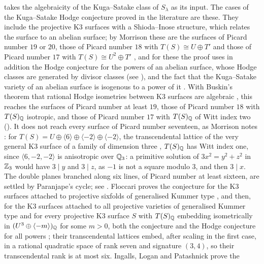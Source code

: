 \begin{remark}
\label{rem:mumfordks}
 takes the algebraicity of the Kuga--Satake class of
$S_{\lambda}$ as its input. The cases of the Kuga--Satake Hodge conjecture
proved in the literature are these. They include the projective K3 surfaces with
a Shioda--Inose structure, which relates the surface to an abelian surface;
by Morrison these are the surfaces of Picard number $19$ or $20$, those of
Picard number $18$ with $T(S)\cong U\oplus T'$ and those of Picard number
$17$ with $T(S)\cong U^{2}\oplus T'$
\cite[Theorem~6.3 and Corollary~6.4]{Mor84}, and for these the proof uses in
addition the Hodge conjecture for the powers of an abelian surface, whose
Hodge classes are generated by divisor classes (see \cite{MZ99}), and the
fact that the Kuga--Satake variety of an abelian surface is isogenous to a
power of it \cite{Mor85}. With Buskin's theorem that rational Hodge
isometries between K3 surfaces are algebraic \cite{Bus19}, this reaches the
surfaces of Picard number at least $19$, those of Picard number $18$ with
$T(S)_{\mathbb{Q}}$ isotropic, and those of Picard number $17$ with $T(S)_{\mathbb{Q}}$ of
Witt index two (). It does not reach every
surface of Picard number seventeen, as Morrison notes
\cite[Remark~7.2]{Mor84}: for
$T(S)=U\oplus\langle6\rangle\oplus\langle-2\rangle\oplus\langle-2\rangle$,
the transcendental lattice of the very general K3 surface of a family of
dimension three \cite[Corollary~2.10]{Mor84}, $T(S)_{\mathbb{Q}}$ has Witt index one,
since $\langle6,-2,-2\rangle$ is anisotropic over $\mathbb{Q}_{3}$: a primitive
solution of $3x^{2}=y^{2}+z^{2}$ in $\mathbb{Z}_{3}$ would have $3\mid y$ and
$3\mid z$, as $-1$ is not a square modulo $3$, and then $3\mid x$. The double planes branched along six lines, of Picard
number at least sixteen, are settled by Paranjape's cycle; see \cite{vG00}.
Floccari proves the conjecture for the K3 surfaces attached to projective
sixfolds of generalised Kummer type \cite{Flo24}, and then, for the K3
surfaces attached to all projective varieties of generalised Kummer type and
for every projective K3 surface $S$ with $T(S)_{\mathbb{Q}}$ embedding isometrically
in $(U^{3}\oplus\langle-m\rangle)_{\mathbb{Q}}$ for some $m>0$, both the conjecture
and the Hodge conjecture for all powers \cite[Theorems~1.2 and~5.11]{Flo25};
their transcendental lattices embed, after scaling in the first case, in a
rational quadratic space of rank seven and signature $(3,4)$, so their
transcendental rank is at most six. Ingalls, Logan and Patashnick prove the

\end{remark}
